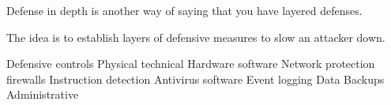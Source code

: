Defense in depth 
  is another way of saying that you have layered defenses. 

The idea is to establish layers of defensive measures to slow an attacker down. 

Defensive controls 
  Physical 
  technical
    Hardware 
    software 
    Network protection 
      firewalls
      Instruction detection 
      Antivirus software 
      Event logging
      Data Backups
  Administrative 